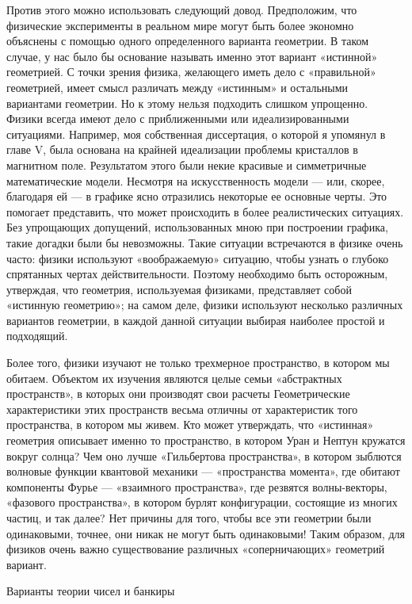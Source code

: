 \documentclass[../main.tex]{subfiles}
\begin{document}
Против этого можно использовать следующий довод. Предположим, что физические эксперименты в реальном мире могут быть более экономно объяснены с помощью одного определенного варианта геометрии. В таком случае, у нас было бы основание называть именно этот вариант «истинной» геометрией. С точки зрения физика, желающего иметь дело с «правильной» геометрией, имеет смысл различать между «истинным» и остальными вариантами геометрии. Но к этому нельзя подходить слишком упрощенно. Физики всегда имеют дело с приближенными или идеализированными ситуациями. Например, моя собственная диссертация, о которой я упомянул в главе V, была основана на крайней идеализации проблемы кристаллов в магнитном поле. Результатом этого были некие красивые и симметричные математические модели. Несмотря на искусственность модели --- или, скорее, благодаря ей --- в графике ясно отразились некоторые ее основные черты. Это помогает представить, что может происходить в более реалистических ситуациях. Без упрощающих допущений, использованных мною при построении графика, такие догадки были бы невозможны. Такие ситуации встречаются в физике очень часто: физики используют «воображаемую» ситуацию, чтобы узнать о глубоко спрятанных чертах действительности. Поэтому необходимо быть осторожным, утверждая, что геометрия, используемая физиками, представляет собой «истинную геометрию»; на самом деле, физики используют несколько различных вариантов геометрии, в каждой данной ситуации выбирая наиболее простой и подходящий.

Более того, физики изучают не только трехмерное пространство, в котором мы обитаем. Объектом их изучения являются целые семьи «абстрактных пространств», в которых они производят свои расчеты Геометрические характеристики этих пространств весьма отличны от характеристик того пространства, в котором мы живем. Кто может утверждать, что «истинная» геометрия описывает именно то пространство, в котором Уран и Нептун кружатся вокруг солнца? Чем оно лучше «Гильбертова пространства», в котором зыблются волновые функции квантовой механики --- «пространства момента», где обитают компоненты Фурье --- «взаимного пространства», где резвятся волны-векторы, «фазового пространства», в котором бурлят конфигурации, состоящие из многих частиц, и так далее? Нет причины для того, чтобы все эти геометрии были одинаковыми, точнее, они никак не могут быть одинаковыми! Таким образом, для физиков очень важно существование различных «соперничающих» геометрий вариант.

Варианты теории чисел и банкиры
\end{document}
